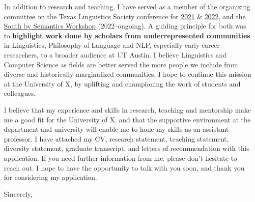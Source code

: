 \documentclass[11pt, letterpaper]{practical-letter}
\begin{document}
In addition to research and teaching, I have served as a member of the organizing committee on the Texas Linguistics Society conference for \href{http://tls.ling.utexas.edu/2021/}{2021} \& \href{http://tls.ling.utexas.edu/2022/}{2022}, and the \href{https://sites.utexas.edu/sxsemantics}{South by Semantics Workshop} (2022--ongoing). A guiding principle for both was to \textbf{highlight work done by scholars from underrepresented communities} in Linguistics, Philosophy of Language and NLP, especially early-career researchers, to a broader audience at UT Austin. I believe Linguistics and Computer Science as fields are better served the more people we include from diverse and historically marginalized communities. I hope to continue this mission at the University of X, by uplifting and championing the work of students and colleagues.

I believe that my experience and skills in research, teaching and mentorship make me a good fit for the University of X, and that the supportive environment at the department and university will enable me to hone my skills as an assistant professor. I have attached my CV, research statement, teaching statement, diversity statement, graduate transcript, and letters of recommendation with this application. If you need further information from me, please don't hesitate to reach out. I hope to have the opportunity to talk with you soon, and thank you for considering my application.

\closing{Sincerely,}
\end{document}

